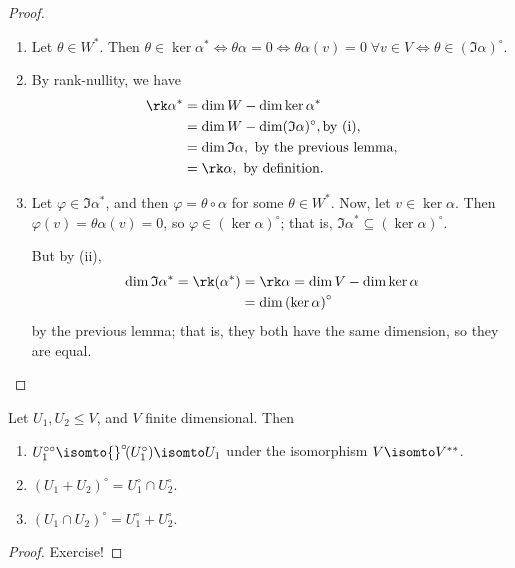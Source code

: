 \begin{proof}
\mbox{}
\begin{enumerate}
	\shortskip
	\item Let $\theta\in W^*$. Then $\theta\in\ker\alpha^* \iff \theta\alpha=0 \iff \theta\alpha(v)=0 \;\forall v\in V \iff \theta\in\left( \Im\alpha \right)^\circ$. %
	\item By rank-nullity, we have
	\begin{align*}
		\rk\alpha^*
		&= \dim W-\dim\ker\alpha^* \\
		&= \dim W-\dim(\Im \alpha)^\circ, \text{by (i)}, \\
		&= \dim \Im\alpha, \text{ by the previous lemma,} \\
		&= \rk\alpha, \text{ by definition.}
	\end{align*}
	\item Let $\varphi\in\Im\alpha^*$, and then $\varphi=\theta\circ\alpha$ for some $\theta\in W^*$. Now, let $v\in\ker\alpha$. Then $\varphi(v)=\theta\alpha(v)=0$, so $\varphi\in\left( \ker\alpha \right)^\circ$; that is, $\Im\alpha^* \subseteq\left( \ker\alpha \right)^\circ$. %
	
	But by (ii),
	\begin{align*}
		\dim\Im\alpha^* = \rk(\alpha^*)
		&= \rk\alpha = \dim V - \dim\ker\alpha \\
		&= \dim\left( \ker\alpha \right)^\circ
	\end{align*}
	by the previous lemma; that is, they both have the same dimension, so they are equal. \qedhere %
\end{enumerate}
\end{proof}

\begin{lemma}
	Let $U_1,U_2\leq V$, and $V$ finite dimensional. Then %
	\begin{enumerate}
		\shortskip
		\item $U_1^{\circ\circ} \isomto {}^\circ\!(U_1^\circ) \isomto U_1$ under the isomorphism $V\isomto V^{**}$. %
		\item $(U_1+U_2)^\circ = U_1^\circ \cap U_2^\circ$.
		\item $(U_1\cap U_2)^\circ = U_1^\circ + U_2^\circ$.
	\end{enumerate}
\end{lemma}
\begin{proof} Exercise! \end{proof}
